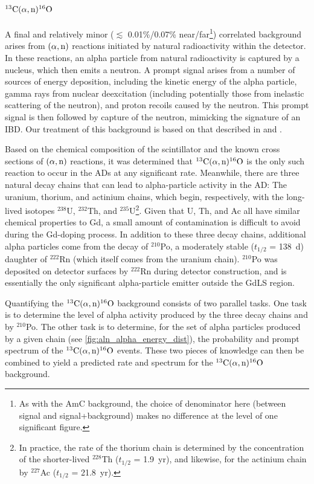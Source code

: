 \documentclass[../thesis.tex]{subfiles}
\begin{document}
\section{$^{13}\mathrm{C}(\alpha, \mathrm{n})^{16}\mathrm{O}$}
\label{sec:bkgCanO}

A final and relatively minor ($\lesssim$ 0.01\%/0.07\% near/far\footnote{As with the AmC background, the choice of denominator here (between signal and signal+background) makes no difference at the level of one significant figure.}) correlated background arises from $(\alpha,\mathrm{n})$ reactions initiated by natural radioactivity within the detector. In these reactions, an alpha particle from natural radioactivity is captured by a nucleus, which then emits a neutron. A prompt signal arises from a number of sources of energy deposition, including the kinetic energy of the alpha particle, gamma rays from nuclear deexcitation (including potentially those from inelastic scattering of the neutron), and proton recoils caused by the neutron. This prompt signal is then followed by capture of the neutron, mimicking the signature of an IBD. Our treatment of this background is based on that described in \cite{Zhao_2014} and \cite{An_2017}.

Based on the chemical composition of the scintillator and the known cross sections of $(\alpha,\mathrm{n})$ reactions, it was determined that $^{13}\mathrm{C}(\alpha, \mathrm{n})^{16}\mathrm{O}$ is the only such reaction to occur in the ADs at any significant rate. Meanwhile, there are three natural decay chains that can lead to alpha-particle activity in the AD: The uranium, thorium, and actinium chains, which begin, respectively, with the long-lived isotopes $^{238}$U, $^{232}$Th, and $^{235}$U\footnote{In practice, the rate of the thorium chain is determined by the concentration of the shorter-lived $^{228}$Th ($t_{1/2}$ = 1.9~yr), and likewise, for the actinium chain by $^{227}$Ac ($t_{1/2}$ = 21.8~yr).}. Given that U, Th, and Ac all have similar chemical properties to Gd, a small amount of contamination is difficult to avoid during the Gd-doping process. In addition to these three decay chains, additional alpha particles come from the decay of $^{210}$Po, a moderately stable ($t_{1/2}$ = 138~d) daughter of $^{222}$Rn (which itself comes from the uranium chain). $^{210}$Po was deposited on detector surfaces by $^{222}$Rn during detector construction, and is essentially the only significant alpha-particle emitter outside the GdLS region.

Quantifying the $^{13}\mathrm{C}(\alpha, \mathrm{n})^{16}\mathrm{O}$ background consists of two parallel tasks. One task is to determine the level of alpha activity produced by the three decay chains and by $^{210}$Po. The other task is to determine, for the set of alpha particles produced by a given chain (see \autoref{fig:aln_alpha_energy_dist}), the probability and prompt spectrum of the $^{13}\mathrm{C}(\alpha, \mathrm{n})^{16}\mathrm{O}$ events. These two pieces of knowledge can then be combined to yield a predicted rate and spectrum for the $^{13}\mathrm{C}(\alpha, \mathrm{n})^{16}\mathrm{O}$ background.
\end{document}
